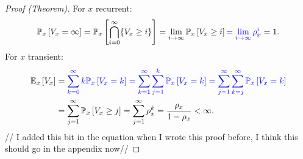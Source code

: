 \begin{proof}[Proof (Theorem)]
	For $x$ recurrent: 
	\begin{align}
		\mathbb{P}_{x} \left[ V_x = \infty \right] = \mathbb{P}_{x} \left[ \bigcap_{i=0}^{\infty} \{V_x \geq i\} \right] = \lim_{i\to \infty} \mathbb{P}_{x} \left[ V_x \geq i \right] {\color{blue}= \lim_{i \to \infty} \rho_x^{i}} = 1 
	.\end{align}
	For $x$ transient:
	\begin{align}
		\mathbb{E}_{x} \left[ V_x \right] &={\color{blue} \sum_{k=0}^{\infty} k \mathbb{P}_{x} \left[ V_x = k \right] = \sum_{k=1}^{\infty} \sum_{j=1}^{k} \mathbb{P}_{x} \left[ V_x=k \right] = \sum_{j=1}^{\infty} \sum_{k=j}^{\infty} \mathbb{P}_{x} \left[ V_x=k \right]} \\
	&= \sum_{j=1}^{\infty} \mathbb{P}_{x} \left[ V_x \geq j \right] = \sum_{j=1}^{\infty} \rho_x^k = \frac{\rho_x}{1-\rho_x} < \infty
	.\end{align}
	{\color{blue}// I added this bit in the equation when I wrote this proof before, I think this should go in the appendix now//}
\end{proof}


